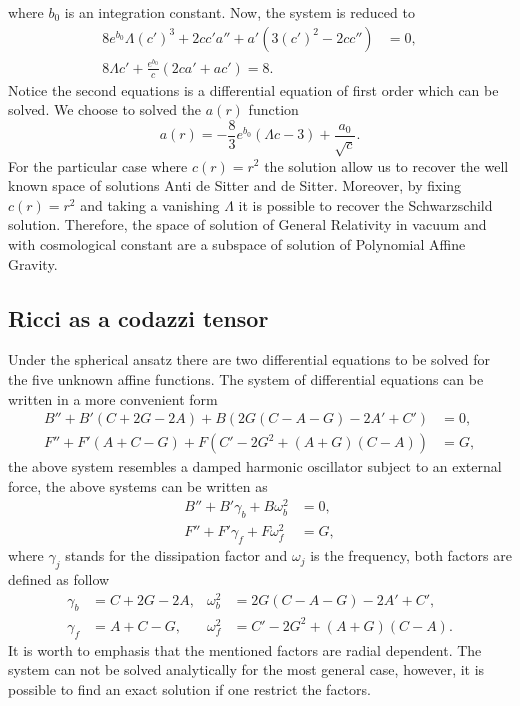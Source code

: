 \documentclass{article}
\begin{document}
where $b_0$ is an integration constant. Now, the system is reduced to 
\begin{align}
    8e^{b_0}\Lambda (c')^3 + 2cc'a'' + a'\left(3(c')^2 -2cc''\right) & = 0, \\
    8\Lambda c' + \frac{e^{b_0}}{c}\left(2ca' + ac'\right) = 8.
\end{align}
Notice the second equations is a differential equation of first order which
can be solved. We choose to solved the $a(r)$ function
\begin{equation}
    a(r) = -\frac{8}{3}e^{b_0}\left(\Lambda c - 3\right) + \frac{a_0}{\sqrt{c}}.
\end{equation}
For the particular case where $c(r) = r^2$ the solution allow us to recover the
well known space of solutions Anti de Sitter and de Sitter. Moreover, by fixing
$c(r) = r^2$ and taking a vanishing $\Lambda$ it is possible to recover the
Schwarzschild solution. Therefore, the space of solution of General Relativity
in vacuum and with cosmological constant are a subspace of solution of Polynomial
Affine Gravity.


\subsection{Ricci as a codazzi tensor}

Under the spherical ansatz there are two differential equations to be solved
for the five unknown affine functions. The system of differential equations
can be written in a more convenient form
\begin{align}
    B'' + B'\left(C + 2G - 2A\right) + B\left(2G\left(C - A - G\right) - 2A' + C'\right) & = 0, \\
    F'' + F'\left(A + C - G\right) + F\left(C' - 2G^2 + \left(A + G\right)\left(C - A\right)\right) & = G,
\end{align}
the above system resembles a damped harmonic oscillator subject to an external force,
the above systems can be written as 
\begin{align}
    B'' + B'\gamma_b + B\omega^2_b & = 0, \label{eq_B}\\
    F'' + F'\gamma_f + F\omega^2_f & = G, \label{eq_F}
\end{align}
where $\gamma_j$ stands for the dissipation factor and $\omega_j$ is the frequency,
both factors are defined as follow
\begin{align}
    \gamma_b & = C + 2G - 2A, & \omega^2_b & = 2G\left(C - A - G\right) - 2A' + C', \\
    \gamma_f & = A + C - G, & \omega^2_f & = C' - 2G^2 + \left(A + G\right)\left(C - A\right).
\end{align}
It is worth to emphasis that the mentioned factors are radial dependent. The system can not
be solved analytically for the most general case, however, it is possible to find an exact
solution if one restrict the factors.
\end{document}
